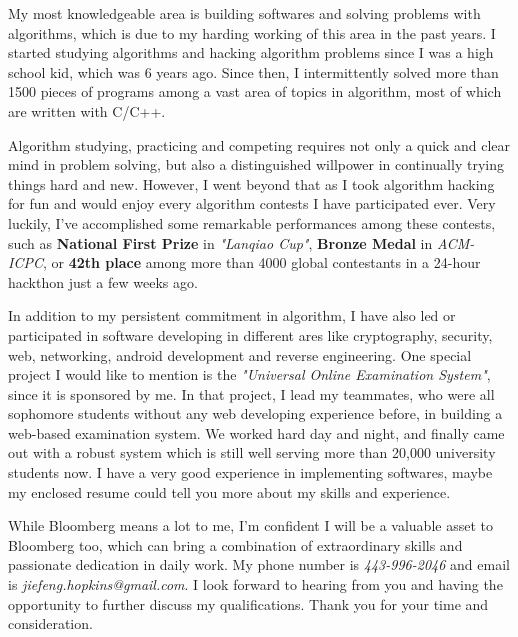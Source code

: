 \documentclass[11pt]{letter} %
\begin{document}
\begin{letter}{
}
My most knowledgeable area is building softwares and solving problems with algorithms, which is due to my harding working of this area in the past years.  
I started studying algorithms and hacking algorithm problems since I was a high school kid, which was 6 years ago. 
Since then, I intermittently solved more than 1500 pieces of programs among a vast area of topics in algorithm, most of which are written with C/C++.

Algorithm studying, practicing and competing requires not only a quick and clear mind in problem solving, but also a distinguished willpower in continually trying things hard and new.
However, I went beyond that as I took algorithm hacking for fun and would enjoy every algorithm contests I have participated ever.
Very luckily, I've accomplished some remarkable performances among these contests, such as \textbf{National First Prize} in
\emph{"Lanqiao Cup"}, \textbf{Bronze Medal} in \emph{ACM-ICPC}, or \textbf{42th place} among more than 4000 global contestants in a 24-hour hackthon just a few weeks ago.



In addition to my persistent commitment in algorithm, I have also led or participated in software developing in
different ares like cryptography, security, web, networking, android development and reverse engineering. 
One special project I would like to mention is the \emph{"Universal Online Examination System"}, since it is sponsored by me.
In that project, I lead my teammates, who were all sophomore students without any web developing experience before, in
building a web-based examination system. We worked hard day and night, and finally came out with a robust system which is still well serving more than 20,000 university students now.
I have a very good experience in implementing softwares, maybe my enclosed resume could tell you more about my skills and experience.

While Bloomberg means a lot to me, I'm confident I will be a valuable asset to Bloomberg too, which can bring a
combination of extraordinary skills and passionate dedication in daily work. 
My phone number is \emph{443-996-2046} and email is \emph{jiefeng.hopkins@gmail.com}. I look forward to hearing from you and having the opportunity to further discuss my qualifications.  Thank you for your time and consideration.




\end{letter}
\end{document}
